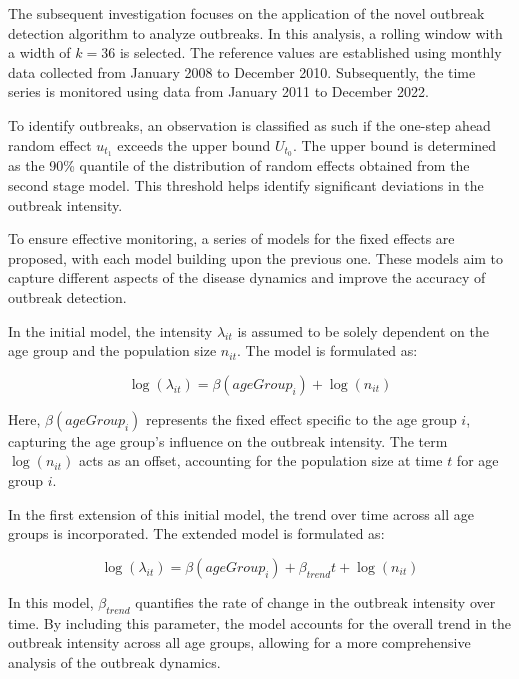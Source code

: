 \documentclass[a4paper,twoside,11pt]{report} %
\theoremstyle{definition}
\theoremstyle{definition}
\theoremstyle{definition}
\theoremstyle{definition}
\theoremstyle{remark}
\begin{document}
The subsequent investigation focuses on the application of the novel outbreak detection algorithm to analyze outbreaks. In this analysis, a rolling window with a width of \(k=36\) is selected. The reference values are established using monthly data collected from January 2008 to December 2010. Subsequently, the time series is monitored using data from January 2011 to December 2022.

To identify outbreaks, an observation is classified as such if the one-step ahead random effect \(u_{t_1}\) exceeds the upper bound \(U_{t_0}\). The upper bound is determined as the 90\% quantile of the distribution of random effects obtained from the second stage model. This threshold helps identify significant deviations in the outbreak intensity.

To ensure effective monitoring, a series of models for the fixed effects are proposed, with each model building upon the previous one. These models aim to capture different aspects of the disease dynamics and improve the accuracy of outbreak detection.

In the initial model, the intensity \(\lambda_{it}\) is assumed to be solely dependent on the age group and the population size \(n_{it}\). The model is formulated as:

\begin{equation}\label{eq:Agegroup}
  \log(\lambda_{it}) = \beta(ageGroup_{i}) + \log(n_{it})
\end{equation}

Here, \(\beta(ageGroup_{i})\) represents the fixed effect specific to the age group \(i\), capturing the age group's influence on the outbreak intensity. The term \(\log(n_{it})\) acts as an offset, accounting for the population size at time \(t\) for age group \(i\).

In the first extension of this initial model, the trend over time across all age groups is incorporated. The extended model is formulated as:

\begin{equation}
  \log(\lambda_{it})=\beta(ageGroup_{i}) + \beta_{trend} t + \log(n_{it})
\end{equation}

In this model, \(\beta_{trend}\) quantifies the rate of change in the outbreak intensity over time. By including this parameter, the model accounts for the overall trend in the outbreak intensity across all age groups, allowing for a more comprehensive analysis of the outbreak dynamics.
\end{document}
